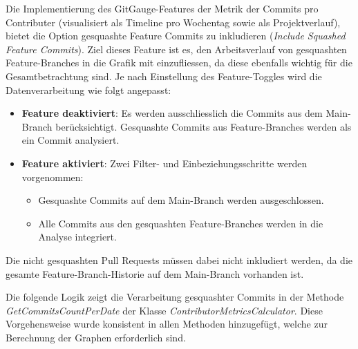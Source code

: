Die Implementierung des GitGauge-Features der Metrik der Commits pro Contributer (visualisiert als Timeline pro Wochentag sowie als Projektverlauf), bietet die Option gesquashte Feature Commits zu inkludieren (\textit{Include Squashed Feature Commits}). Ziel dieses Feature ist es, den Arbeitsverlauf von gesquashten Feature-Branches in die Grafik mit einzufliessen, da diese ebenfalls wichtig für die Gesamtbetrachtung sind. 
Je nach Einstellung des Feature-Toggles wird die Datenverarbeitung wie folgt angepasst: \\
\begin{itemize}
    \item \textbf{Feature deaktiviert}: Es werden ausschliesslich die Commits aus dem Main-Branch berücksichtigt. Gesquashte Commits aus Feature-Branches werden als ein Commit analysiert.
    \item \textbf{Feature aktiviert}: Zwei Filter- und Einbeziehungsschritte werden vorgenommen:
        \begin{itemize}
        \item Gesquashte Commits auf dem Main-Branch werden ausgeschlossen.
        \item Alle Commits aus den gesquashten Feature-Branches werden in die Analyse integriert.
    \end{itemize}
\end{itemize}

Die nicht gesquashten Pull Requests müssen dabei nicht inkludiert werden, da die gesamte Feature-Branch-Historie auf dem Main-Branch vorhanden ist. 

Die folgende Logik zeigt die Verarbeitung gesquashter Commits in der Methode \textit{GetCommitsCountPerDate} der Klasse \textit{ContributorMetricsCalculator}. Diese Vorgehensweise wurde konsistent in allen Methoden hinzugefügt, welche zur Berechnung der Graphen erforderlich sind.

